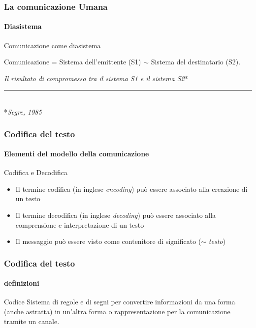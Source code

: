 \begin{frame}
	\frametitle{La comunicazione Umana}
	\framesubtitle{Diasistema}
	\addtocounter{nframe}{1}

	\begin{block}{Comunicazione come diasistema}
		\begin{center}Comunicazione = Sistema dell'emittente (S1) $\sim$  Sistema del destinatario (S2).\end{center}
		\textit{Il risultato di compromesso tra il sistema S1 e il sistema S2}*
	\end{block}

	\rule{7cm}{0.015cm}
	\\*\tiny\textit{Segre, 1985}
\end{frame}

\begin{frame}
	\frametitle{Codifica del testo}
	\framesubtitle{Elementi del modello della comunicazione}
	\addtocounter{nframe}{1}

	\begin{block}{Codifica e Decodifica}
		\begin{itemize}
			\item Il termine codifica (in inglese \textit{encoding}) può essere associato alla creazione di un testo
			\item Il termine decodifica (in inglese \textit{decoding}) può essere associato alla comprensione e interpretazione di un testo
			\item Il messaggio può essere visto come contenitore di significato ($\sim$ \textit{testo})
		\end{itemize}
	\end{block}

\end{frame}

\begin{frame}
	\frametitle{Codifica del testo}
	\framesubtitle{definizioni}
	\addtocounter{nframe}{1}

	\begin{block}{Codice}
		Sistema di regole e di segni per convertire informazioni da una forma (anche astratta) in un'altra forma o rappresentazione per la comunicazione tramite un canale.
	\end{block}

\end{frame}

